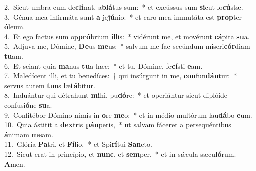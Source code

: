 {2.~}Sicut umbra cum de\textbf{clí}nat, a\textbf{blá}tus sum:~* et excússus sum \textbf{si}cut lo\textbf{cú}stæ.\\
{3.~}Génua mea infirmáta sunt \textbf{a} je\textbf{jú}nio:~* et caro mea immutáta est \textbf{prop}ter \textbf{ó}leum.\\
{4.~}Et ego factus sum op\textbf{pró}brium \textbf{il}lis:~* vidérunt me, et movérunt \textbf{cá}pita \textbf{su}a.\\
{5.~}Adjuva me, Dómine, \textbf{De}us \textbf{me}us:~* salvum me fac secúndum miseri\textbf{cór}diam \textbf{tu}am.\\
{6.~}Et sciant quia \textbf{ma}nus \textbf{tu}a hæc:~* et tu, Dómine, fe\textbf{cí}sti \textbf{e}am.\\
{7.~}Maledícent illi, et tu benedíces:~† qui insúrgunt in me, \textbf{con}fun\textbf{dán}tur:~* servus autem \textbf{tu}us læ\textbf{tá}bitur.\\
{8.~}Induántur qui détrahunt \textbf{mi}hi, pu\textbf{dó}re:~* et operiántur sicut diplóide confusi\textbf{ó}ne \textbf{su}a.\\
{9.~}Confitébor Dómino nimis in \textbf{o}re \textbf{me}o:~* et in médio multórum lau\textbf{dá}bo \textbf{e}um.\\
{10.~}Quia ástitit a \textbf{dex}tris \textbf{páu}peris,~* ut salvam fáceret a persequéntibus \textbf{á}nimam \textbf{me}am.\\
{11.~}Glória \textbf{Pa}tri, et \textbf{Fí}lio,~* et Spi\textbf{rí}tui \textbf{San}cto.\\
{12.~}Sicut erat in princípio, et \textbf{nunc}, et \textbf{sem}per,~* et in sǽcula sæcu\textbf{ló}rum. \textbf{A}men.\\
